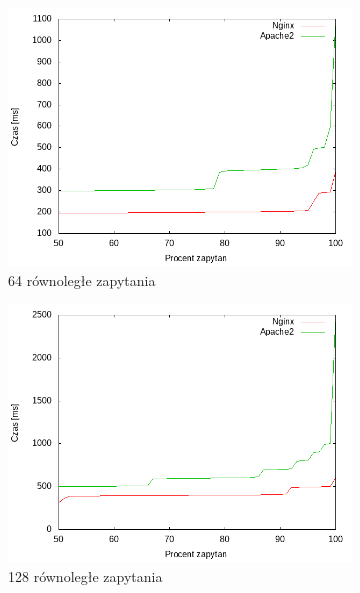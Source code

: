 \begin{figure}
	\begin{subfigure}[h]{0.3\textwidth}
		\includegraphics[width=\textwidth]{testy/wybor_fib_5_64.png}
		\caption{64 równoległe zapytania}
	\end{subfigure}
	\begin{subfigure}[h]{0.3\textwidth}
		\includegraphics[width=\textwidth]{testy/wybor_fib_5_128.png}
		\caption{128 równoległe zapytania}
	\end{subfigure}
	\begin{subfigure}[h]{0.3\textwidth}

\end{subfigure}
\end{figure}
